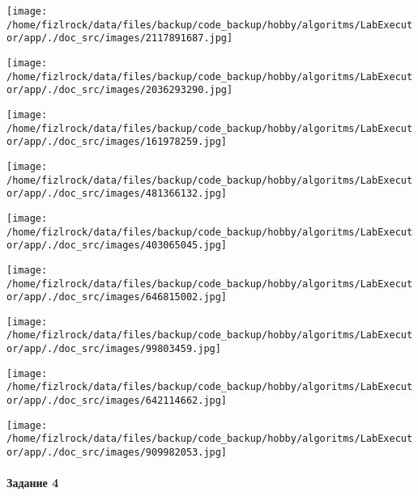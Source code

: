 \documentclass[a4paper, 12pt]{article}
\begin{document}
\texttt{[image: /home/fizlrock/data/files/backup/code\_backup/hobby/algoritms/LabExecutor/app/./doc\_src/images/2117891687.jpg]}

\texttt{[image: /home/fizlrock/data/files/backup/code\_backup/hobby/algoritms/LabExecutor/app/./doc\_src/images/2036293290.jpg]}

\texttt{[image: /home/fizlrock/data/files/backup/code\_backup/hobby/algoritms/LabExecutor/app/./doc\_src/images/161978259.jpg]}

\texttt{[image: /home/fizlrock/data/files/backup/code\_backup/hobby/algoritms/LabExecutor/app/./doc\_src/images/481366132.jpg]}

\texttt{[image: /home/fizlrock/data/files/backup/code\_backup/hobby/algoritms/LabExecutor/app/./doc\_src/images/403065045.jpg]}

\texttt{[image: /home/fizlrock/data/files/backup/code\_backup/hobby/algoritms/LabExecutor/app/./doc\_src/images/646815002.jpg]}

\texttt{[image: /home/fizlrock/data/files/backup/code\_backup/hobby/algoritms/LabExecutor/app/./doc\_src/images/99803459.jpg]}

\texttt{[image: /home/fizlrock/data/files/backup/code\_backup/hobby/algoritms/LabExecutor/app/./doc\_src/images/642114662.jpg]}

\texttt{[image: /home/fizlrock/data/files/backup/code\_backup/hobby/algoritms/LabExecutor/app/./doc\_src/images/909982053.jpg]}
\pagebreak
\paragraph{Задание 4}
\end{document}
